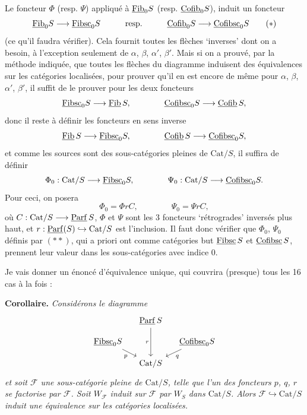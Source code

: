 Le foncteur $\Phi$ (resp. $\Psi$) appliqué à $\underline{\mathrm{Fib}}_0S$ (resp. $\underline{\mathrm{Cofib}}_0S$), induit un foncteur
\[
\ul{Fib}_0S \longrightarrow \ul{Fibsc}_0S \qquad\quad \text{resp.} \qquad\quad \ul{Cofib}_0S \longrightarrow \ul{Cofibsc}_0S \tag*{$(*)$}
\]
(ce qu'il faudra vérifier). Cela fournit toutes les flèches `inverses' dont on a besoin, à l'exception seulement de $\alpha$, $\beta$, $\alpha'$, $\beta'$. Mais si on a prouvé, par la méthode indiquée, que toutes les flèches du diagramme induisent des équivalences sur les catégories localisées, pour prouver qu'il en est encore de même pour $\alpha$, $\beta$, $\alpha'$, $\beta'$, il suffit de le prouver pour les deux foncteurs
\[
\underline{\mathrm{Fibsc}}_0S \longrightarrow \underline{\mathrm{Fib}}\,S, \qquad\qquad \underline{\mathrm{Cofibsc}}_0S \longrightarrow \underline{\mathrm{Cofib}}\,S,
\]
donc il reste à définir les foncteurs en sens inverse
\[
\underline{\mathrm{Fib}}\,S \longrightarrow \underline{\mathrm{Fibsc}}_0S, \qquad\qquad \underline{\mathrm{Cofib}}\,S \longrightarrow \underline{\mathrm{Cofibsc}}_0S,
\]
et comme les sources sont des sous-catégories pleines de $\mathrm{Cat}/S$, il suffira de définir
\[
\Phi_0 : \mathrm{Cat}/S \longrightarrow \underline{\mathrm{Fibsc}}_0S, \qquad\qquad \Psi_0 : \mathrm{Cat}/S \longrightarrow \underline{\mathrm{Cofibsc}}_0S.
\]
Pour ceci, on posera
\[
\Phi_0 = \Phi r C, \qquad\qquad \Psi_0 = \Psi r C, \tag*{$(**)$}
\]
où $C : \mathrm{Cat}/S \longrightarrow \underline{\mathrm{Parf}}\,S$, $\Phi$ et $\Psi$ sont les 3 foncteurs `rétrogrades' inversés plus haut, et $r : \underline{\mathrm{Parf}}(S) \hookrightarrow \mathrm{Cat}/S$ est l'inclusion. Il faut donc vérifier que $\Phi_0$, $\Psi_0$ définis par $(**)$, qui a priori ont comme catégories but $\underline{\mathrm{Fibsc}}\,S$ et $\underline{\mathrm{Cofibsc}}\,S$, prennent leur valeur dans les sous-catégories avec indice 0.

Je vais donner un énoncé d'équivalence unique, qui couvrira (presque) tous les 16 cas à la fois :

\textbf{Corollaire.} \textit{Considérons le diagramme}
\[
\begin{tikzcd}[column sep=small, row sep=small]
 & \ul{Parf}\,S \arrow[dd, "r"'] & \\
\ul{Fibsc}_0S \arrow[dr, "p"'] & & \ul{Cofibsc}_0S \arrow[dl, "q"] \\
 & \mathrm{Cat}/S &
\end{tikzcd}
\]
\textit{et soit $\mathcal{F}$ une sous-catégorie pleine de $\mathrm{Cat}/S$, telle que l'un des foncteurs $p$, $q$, $r$ se factorise par $\mathcal{F}$. Soit $W_{\mathcal{F}}$ induit sur $\mathcal{F}$ par $W_S$ dans $\mathrm{Cat}/S$. Alors $\mathcal{F} \hookrightarrow \mathrm{Cat}/S$ induit une équivalence sur les catégories localisées.}

